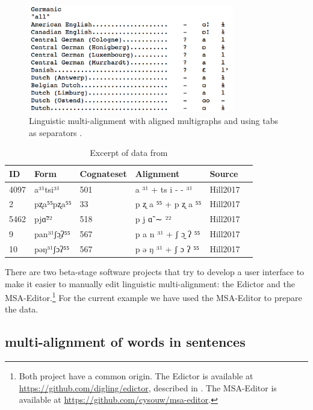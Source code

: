 \documentclass[11pt]{article}
\begin{document}
\begin{figure}[htbp]
  \centering
  \includegraphics[width=0.8\textwidth]{images/multialign_list.png}
  \caption{Linguistic multi-alignment with aligned multigraphs and using tabs as separators \parencite{list2014benchmark}.}
  \label{fig:multialign_list}
\end{figure}

\begin{table}[htp]
\centering
\begin{tabular}{llllll}                                              \hline
 ID   & Form        & Cognateset & Alignment           & Source   \\ \hline
 4097 & a³¹tsi³¹    & 501        & a ³¹ + ts i - - ³¹  & Hill2017 \\
 2    & pʐa⁵⁵pʐa⁵⁵  & 33         & p ʐ a ⁵⁵ + p ʐ a ⁵⁵ & Hill2017 \\ 
 5462 & pjɑ̃²²       & 518        & p j ɑ̃ ∼ ²²          & Hill2017 \\ 
 9    & pan³¹ʃɔ̱ʔ⁵⁵  & 567        & p a n ³¹ + ʃ ɔ̰ ʔ ⁵⁵ & Hill2017 \\ 
 10   & pəŋ³¹ʃɔʔ⁵⁵  & 567        & p ə ŋ ³¹ + ʃ ɔ ʔ ⁵⁵ & Hill2017 \\ \hline
\end{tabular}
\caption{Excerpt of data from \textcite{hill2017}}
\label{tab:data_hill}
\end{table}

There are two beta-stage software projects that try to develop a user interface to make it easier to manually edit linguistic multi-alignment: the Edictor and the MSA-Editor.\footnote{Both project have a common origin. The Edictor is available at \url{https://github.com/digling/edictor}, described in \textcite{list2017}. The MSA-Editor is available at \url{https://github.com/cysouw/msa-editor}.} For the current example we have used the MSA-Editor to prepare the data.

\subsection{multi-alignment of words in sentences}
\end{document}
